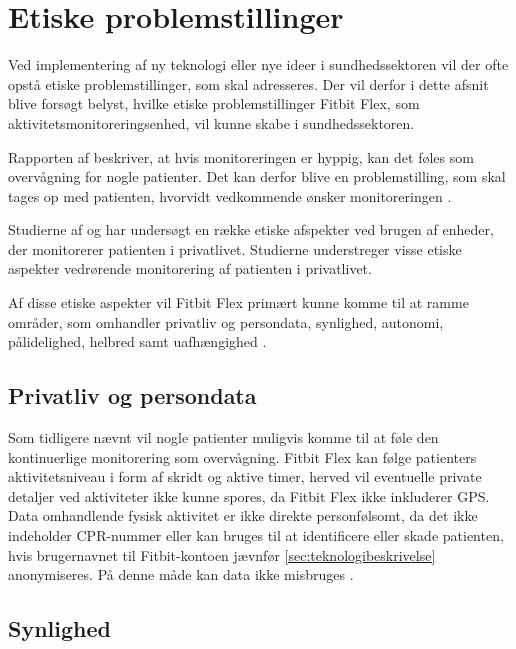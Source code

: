 \section{Etiske problemstillinger}

Ved implementering af ny teknologi eller nye ideer i sundhedssektoren vil der ofte opstå etiske problemstillinger, som skal adresseres. Der vil derfor i dette afsnit blive forsøgt belyst, hvilke etiske problemstillinger Fitbit Flex, som aktivitetsmonitoreringsenhed, vil kunne skabe i sundhedssektoren.

Rapporten af \citeauthor{patienthome2015} beskriver, at hvis monitoreringen er hyppig, kan det føles som overvågning for nogle patienter. Det kan derfor blive en problemstilling, som skal tages op med patienten, hvorvidt vedkommende ønsker monitoreringen \citep{patienthome2015, SundhedsstyrelsenPatientersRetsstilling2016}.

Studierne af \citeauthor{Mittelstand2011} og \citeauthor{Nordgren2013} har undersøgt en række etiske afspekter ved brugen af enheder, der monitorerer patienten i privatlivet. Studierne understreger visse etiske aspekter vedrørende monitorering af patienten i privatlivet.

Af disse etiske aspekter vil Fitbit Flex primært kunne komme til at ramme områder, som omhandler privatliv og persondata, synlighed, autonomi, pålidelighed, helbred samt uafhængighed \citep{Nordgren2013,Mittelstand2011}.


\subsection{Privatliv og persondata}

Som tidligere nævnt vil nogle patienter muligvis komme til at føle den kontinuerlige monitorering som overvågning. Fitbit Flex kan følge patienters aktivitetsniveau i form af skridt og aktive timer, herved vil eventuelle private detaljer ved aktiviteter ikke kunne spores, da Fitbit Flex ikke inkluderer GPS.
Data omhandlende fysisk aktivitet er ikke direkte personfølsomt, da det ikke indeholder CPR-nummer eller kan bruges til at identificere eller skade patienten, hvis brugernavnet til Fitbit-kontoen jævnfør \autoref{sec:teknologibeskrivelse} anonymiseres. På denne måde kan data ikke misbruges  \citep{Mittelstand2011}.


\subsection{Synlighed}


